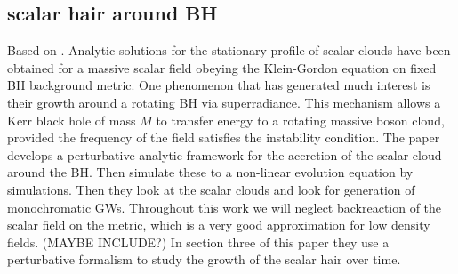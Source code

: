 \documentclass[12 pt]{article}
\begin{document}
	\subsection{scalar hair around BH}
	Based on \cite{Kerrhair}.
	Analytic solutions for the stationary profile of scalar clouds have been obtained for a massive scalar field obeying the Klein-Gordon equation on fixed BH background metric. One phenomenon that has generated much interest is their growth around a rotating BH via superradiance. This mechanism allows a Kerr black hole of mass $M$ to transfer energy to a rotating massive boson cloud, provided the frequency of the field satisfies the instability condition.
	The paper develops a perturbative analytic framework for the accretion of the scalar cloud around the BH. Then simulate these to a non-linear evolution equation by simulations. Then they look at the scalar clouds and look for generation of monochromatic GWs. Throughout this work we will neglect backreaction of the scalar field on the metric, which is a very good approximation for low density fields. (MAYBE INCLUDE?)
	In section three of this paper they use a perturbative formalism to study the growth of the scalar hair  over time. 
	
\end{document}
